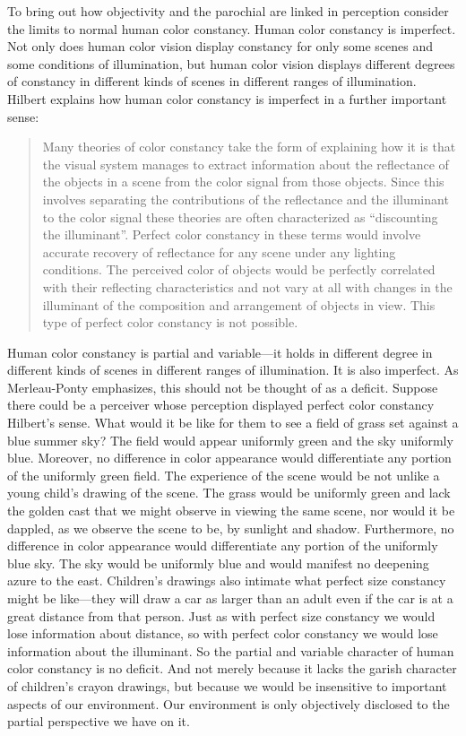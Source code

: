 To bring out how objectivity and the parochial are linked in perception consider the limits to normal human color constancy. Human color constancy is imperfect. Not only does human color vision display constancy for only some scenes and some conditions of illumination, but human color vision displays different degrees of constancy in different kinds of scenes in different ranges of illumination. Hilbert explains how human color constancy is imperfect in a further important sense:
	\begin{quote}
		Many theories of color constancy take the form of explaining how it is that the visual system manages to extract information about the reflectance of the objects in a scene from the color signal from those objects. Since this involves separating the contributions of the reflectance and the illuminant to the color signal these theories are often characterized as ``discounting the illuminant''. Perfect color constancy in these terms would involve accurate recovery of reflectance for any scene under any lighting conditions. The perceived color of objects would be perfectly correlated with their reflecting characteristics and not vary at all with changes in the illuminant of the composition and arrangement of objects in view. This type of perfect color constancy is not possible. \citep[143]{Hilbert:2007qy}
	\end{quote}
Human color constancy is partial and variable---it holds in different degree in different kinds of scenes in different ranges of illumination. It is also imperfect. As Merleau-Ponty emphasizes, this should not be thought of as a deficit. Suppose there could be a perceiver whose perception displayed perfect color constancy Hilbert's sense. What would it be like for them to see a field of grass set against a blue summer sky? The field would appear uniformly green and the sky uniformly blue. Moreover, no difference in color appearance would differentiate any portion of the uniformly green field. The experience of the scene would be not unlike a young child's drawing of the scene. The grass would be uniformly green and lack the golden cast that we might observe in viewing the same scene, nor would it be dappled, as we observe the scene to be, by sunlight and shadow. Furthermore, no difference in color appearance would differentiate any portion of the uniformly blue sky. The sky would be uniformly blue and would manifest no deepening azure to the east. Children's drawings also intimate what perfect size constancy might be like---they will draw a car as larger than an adult even if the car is at a great distance from that person. Just as with perfect size constancy we would lose information about distance, so with perfect color constancy we would lose information about the illuminant. So the partial and variable character of human color constancy is no deficit. And not merely because it lacks the garish character of children's crayon drawings, but because we would be insensitive to important aspects of our environment. Our environment is only objectively disclosed to the partial perspective we have on it.

